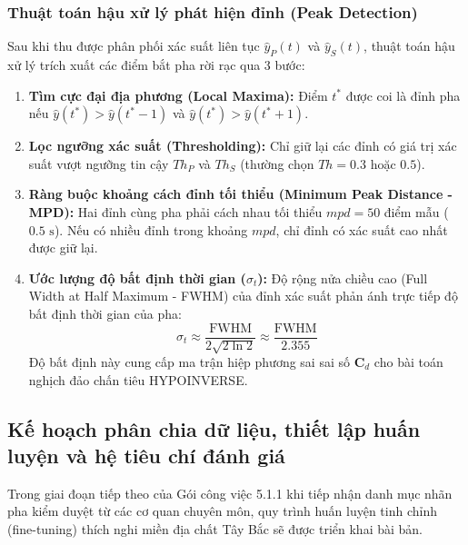 \documentclass[preprint,1p]{elsarticle}
\begin{document}
\subsubsection{Thuật toán hậu xử lý phát hiện đỉnh (Peak Detection)}
Sau khi thu được phân phối xác suất liên tục $\hat{y}_P(t)$ và $\hat{y}_S(t)$, thuật toán hậu xử lý trích xuất các điểm bắt pha rời rạc qua 3 bước:
\begin{enumerate}
    \item \textbf{Tìm cực đại địa phương (Local Maxima):} Điểm $t^*$ được coi là đỉnh pha nếu $\hat{y}(t^*) > \hat{y}(t^* - 1)$ và $\hat{y}(t^*) > \hat{y}(t^* + 1)$.
    \item \textbf{Lọc ngưỡng xác suất (Thresholding):} Chỉ giữ lại các đỉnh có giá trị xác suất vượt ngưỡng tin cậy $Th_P$ và $Th_S$ (thường chọn $Th = 0.3$ hoặc $0.5$).
    \item \textbf{Ràng buộc khoảng cách đỉnh tối thiểu (Minimum Peak Distance - MPD):} Hai đỉnh cùng pha phải cách nhau tối thiểu $mpd = 50$ điểm mẫu ($0.5\text{ s}$). Nếu có nhiều đỉnh trong khoảng $mpd$, chỉ đỉnh có xác suất cao nhất được giữ lại.
    \item \textbf{Ước lượng độ bất định thời gian ($\sigma_t$):} Độ rộng nửa chiều cao (Full Width at Half Maximum - FWHM) của đỉnh xác suất phản ánh trực tiếp độ bất định thời gian của pha:
    \begin{equation}
    \sigma_t \approx \frac{\text{FWHM}}{2\sqrt{2\ln 2}} \approx \frac{\text{FWHM}}{2.355}
    \label{eq:fwhm}
    \end{equation}
    Độ bất định này cung cấp ma trận hiệp phương sai sai số $\mathbf{C}_d$ cho bài toán nghịch đảo chấn tiêu HYPOINVERSE.
\end{enumerate}

\subsection{Kế hoạch phân chia dữ liệu, thiết lập huấn luyện và hệ tiêu chí đánh giá}
\label{sec:methods_plan}

Trong giai đoạn tiếp theo của Gói công việc 5.1.1 khi tiếp nhận danh mục nhãn pha kiểm duyệt từ các cơ quan chuyên môn, quy trình huấn luyện tinh chỉnh (fine-tuning) thích nghi miền địa chất Tây Bắc sẽ được triển khai bài bản.
\end{document}
